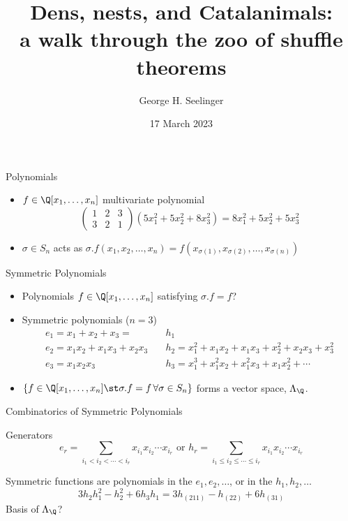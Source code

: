 \documentclass{beamer}
\title[Dens, Nests, and Catalanimals]{Dens, nests, and Catalanimals:
  \\ a walk through the zoo of shuffle theorems} %
\author[George H. Seelinger]{George H. Seelinger} %
\institute[UMich] %
{
  \medskip
\textit{ghseeli@umich.edu}\\ %
\medskip
  joint with Jonah Blasiak, Mark Haiman, Jennifer Morse, and Anna
  Pun\\
  \medskip
Michigan Combinatorics Seminar %
}
\date{17 March 2023} %
\newcommand{\sym}{\Lambda}
\newcounter{c}
\begin{document}
\begin{frame}
 \titlepage 
\end{frame}
\begin{frame}{Polynomials}
  \begin{itemize}
  \item \(f \in \Q[x_1,\ldots,x_n]\) multivariate polynomial \pause
    \[
      \left(
        \begin{matrix}
          1 & 2 & 3\\
          3 & 2 & 1
        \end{matrix}
      \right) (5x_1^2+5x_2^2+8x_3^2) = 8x_1^2+5x_2^2+5x_3^2
    \]\pause
  \item \(\sigma \in S_n\) acts as \(\sigma.f(x_1,x_2,\ldots,x_n) =
    f(x_{\sigma(1)}, x_{\sigma(2)},\ldots,x_{\sigma(n)})\)
  \end{itemize}
\end{frame}
\begin{frame}{Symmetric Polynomials}
  \begin{itemize}
    \item Polynomials \(f \in \Q[x_1,\ldots,x_n]\) satisfying \(\sigma.f
    = f\)? \pause
  \item Symmetric polynomials (\(n=3\))
    \begin{align*}
      e_1 = x_1 + x_2 + x_3 = & h_1  \\
      e_2 = x_1 x_2 + x_1 x_3 + x_2 x_3 \quad & h_2 = x_1^2 + x_1 x_2 + x_1
                                          x_3 + x_2^2 +  x_2 x_3 +x_3^2  \\
      e_3 = x_1 x_2 x_3 \quad & h_3 = x_1^3 + x_1^2 x_2 + x_1^2 x_3 + x_1
                          x_2^2 + \cdots
    \end{align*} \pause
  \item \(\{f \in \Q[x_1,\ldots,x_n] \st \sigma.f = f \, \forall \sigma
    \in S_n\}\) forms a vector space, \(\sym_\Q\).
\end{itemize}
\end{frame}
\begin{frame}{Combinatorics of Symmetric Polynomials}
  \begin{block}{Generators}
    \[
      e_r =
      \sum_{i_1 < i_2 < \cdots < i_r} x_{i_1} x_{i_2} \cdots x_{i_r}
      \text { or }
      h_r = 
      \sum_{i_1 \leq i_2 \leq \cdots \leq i_r} x_{i_1} x_{i_2} \cdots x_{i_r}
    \]\pause 
  \end{block}
    Symmetric functions are polynomials in the \(e_1,e_2,\ldots\), or
    in the \(h_1,h_2,\ldots\) \[
     3 h_2 h_1^2 - h_2^2 + 6 h_3 h_1 = 3 h_{(211)} - h_{(22)} + 6 h_{(31)}
    \]
    \pause
    Basis of \(\sym_\Q\)?
\end{frame}
\end{document}
